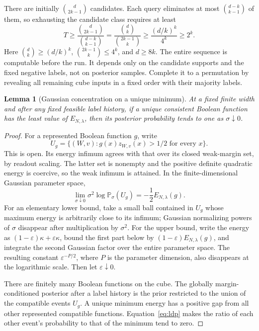 \documentclass[11pt]{article}
\newtheorem{lemma}[theorem]{Lemma}
\newcommand{\Pp}{\mathbb P}
\begin{document}
There are initially $\binom d{2k-1}$ candidates. Each query eliminates
at most $\binom{d-k}{k-1}$ of them, so exhausting the candidate class
requires at least
\[
 T\ge\frac{\binom d{2k-1}}{\binom{d-k}{k-1}}
 =\frac{\binom d k}{\binom{2k-1}k}
 \ge\frac{(d/k)^k}{4^k}\ge2^k.
\]
Here $\binom d k\ge(d/k)^k$, $\binom{2k-1}k\le4^k$, and $d\ge8k$.
The entire sequence is computable before the run. It depends only on
the candidate supports and the fixed negative labels, not on posterior
samples. Complete it to a permutation by revealing all remaining cube
inputs in a fixed order with their majority labels.

\begin{lemma}[Gaussian concentration on a unique minimum]\label{lem:rate}
At a fixed finite width and after any fixed feasible label history,
if a unique consistent Boolean function has the least value of
$E_{N,\lambda}$, then its posterior probability tends to one as
$\sigma\downarrow0$.
\end{lemma}
\begin{proof}
For a represented Boolean function $g$, write
\[
 U_g=\{(W,v):g(x)z_{W,v}(x)>1/2\text{ for every }x\}.
\]
This is open. Its energy infimum agrees with that over its closed
weak-margin set, by readout scaling. The latter set is nonempty and
the positive definite quadratic energy is coercive, so the weak
infimum is attained. In the finite-dimensional Gaussian parameter
space,
\begin{equation}\label{eq:ldp}
 \lim_{\sigma\downarrow0}\sigma^2\log\Pp_\sigma(U_g)
 =-\frac12 E_{N,\lambda}(g).
\end{equation}
For an elementary lower bound, take a small ball contained in $U_g$
whose maximum energy is arbitrarily close to its infimum; Gaussian
normalizing powers of $\sigma$ disappear after multiplication by
$\sigma^2$. For the upper bound, write the energy as
$(1-\varepsilon)\kappa+\varepsilon\kappa$, bound the first part below
by $(1-\varepsilon)E_{N,\lambda}(g)$, and integrate the second Gaussian
factor over the entire parameter space. The resulting constant
$\varepsilon^{-P/2}$, where $P$ is the parameter dimension, also
disappears at the logarithmic scale. Then let $\varepsilon\downarrow0$.

There are finitely many Boolean functions on the cube.
The globally margin-conditioned posterior after a label history is
the prior restricted to the union of the compatible events $U_g$.
A unique minimum energy has a positive gap from all other represented
compatible functions. Equation~\eqref{eq:ldp} makes the ratio of each
other event's probability to that of the minimum tend to zero.
\end{proof}
\end{document}
